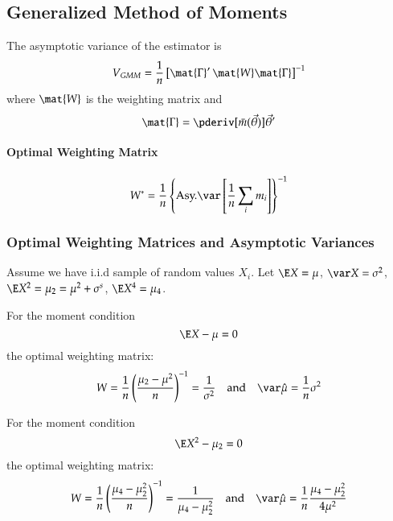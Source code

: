 \documentclass[a4paper]{article}
\numberwithin{equation}{subsection}
\begin{document}
\subsection{Generalized Method of Moments}
\label{sec:gmm}

The asymptotic variance of the estimator is
\begin{equation}
  V_{GMM} = \frac{1}{n} 
  \left[ \mat{\Gamma}' \, \mat{W} \mat{\Gamma} \right]^{-1}
\end{equation}
where $\mat{W}$ is the weighting matrix and 
\begin{equation}
  \mat{\Gamma} = \pderiv[\bar m(\vec{\theta})]{\vec{\theta}'}
\end{equation}

\paragraph{Optimal Weighting Matrix}

\begin{equation}
  W^{*} = \frac{1}{n} 
  \left\{\text{Asy.} \var \left[\frac{1}{n} \sum_{i} m_{i} \right] \right\}^{-1}
\end{equation}


\subsubsection{Optimal Weighting Matrices and Asymptotic Variances}
\label{sec:optimalW}

Assume we have i.i.d sample of random values $X_{i}$.
Let $\E X = \mu$, $\var X = \sigma^{2}$, $\E X^{2} = \mu_{2} = \mu^{2}
+ \sigma^{s}$, $\E X^{4} = \mu_{4}$.  

For the moment condition
\begin{equation}
  \E X - \mu = 0
\end{equation}
the optimal weighting matrix:
\begin{equation}
  W = 
  \frac{1}{n} \left(\frac{\mu_{2} - \mu^{2}}{n} \right)^{-1}
  =
  \frac{1}{\sigma^{2}}
  \quad\text{and}\quad
  \var \hat\mu = \frac{1}{n} \sigma^{2}
\end{equation}

For the moment condition
\begin{equation}
  \E X^{2} - \mu_{2} = 0
\end{equation}
the optimal weighting matrix:
\begin{equation}
  W = 
  \frac{1}{n} \left(\frac{\mu_{4} - \mu_{2}^{2}}{n} \right)^{-1}
  =
  \frac{1}{\mu_{4} - \mu_{2}^{2}}
  \quad\text{and}\quad
  \var \hat\mu = \frac{1}{n} \frac{\mu_{4} - \mu_{2}^{2}}{4\mu^{2}}
\end{equation}
\end{document}
